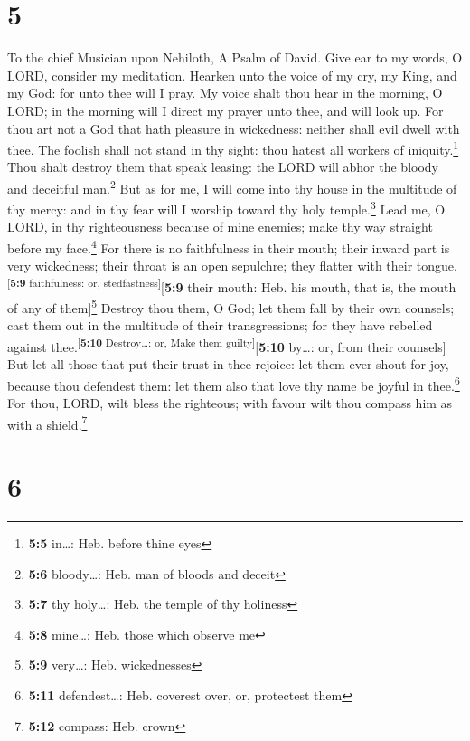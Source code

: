 \hypertarget{section-4}{%
\section{5}\label{section-4}}

To the chief Musician upon Nehiloth, A Psalm of David. 
Give ear to my words, O LORD, consider my meditation. 
Hearken unto the voice of my cry, my King, and my God: for unto thee
will I pray.  My voice shalt thou hear in the morning, O
LORD; in the morning will I direct my prayer unto thee, and will look
up.  For thou art not a God that hath pleasure in
wickedness: neither shall evil dwell with thee.  The
foolish shall not stand in thy sight: thou hatest all workers of
iniquity.\footnote{\textbf{5:5} in\ldots: Heb. before thine eyes}
 Thou shalt destroy them that speak leasing: the LORD will
abhor the bloody and deceitful man.\footnote{\textbf{5:6} bloody\ldots:
  Heb. man of bloods and deceit}  But as for me, I will
come into thy house in the multitude of thy mercy: and in thy fear will
I worship toward thy holy temple.\footnote{\textbf{5:7} thy holy\ldots:
  Heb. the temple of thy holiness}  Lead me, O LORD, in
thy righteousness because of mine enemies; make thy way straight before
my face.\footnote{\textbf{5:8} mine\ldots: Heb. those which observe me}
 For there is no faithfulness in their mouth; their inward
part is very wickedness; their throat is an open sepulchre; they flatter
with their tongue.\textsuperscript{{[}\textbf{5:9} faithfulness: or,
stedfastness{]}}{[}\textbf{5:9} their mouth: Heb. his mouth, that is,
the mouth of any of them{]}\footnote{\textbf{5:9} very\ldots: Heb.
  wickednesses}  Destroy thou them, O God; let them fall
by their own counsels; cast them out in the multitude of their
transgressions; for they have rebelled against
thee.\textsuperscript{{[}\textbf{5:10} Destroy\ldots: or, Make them
guilty{]}}{[}\textbf{5:10} by\ldots: or, from their counsels{]}
 But let all those that put their trust in thee rejoice:
let them ever shout for joy, because thou defendest them: let them also
that love thy name be joyful in thee.\footnote{\textbf{5:11}
  defendest\ldots: Heb. coverest over, or, protectest them}
 For thou, LORD, wilt bless the righteous; with favour
wilt thou compass him as with a shield.\footnote{\textbf{5:12} compass:
  Heb. crown}

\hypertarget{section-5}{%
\section{6}\label{section-5}}

